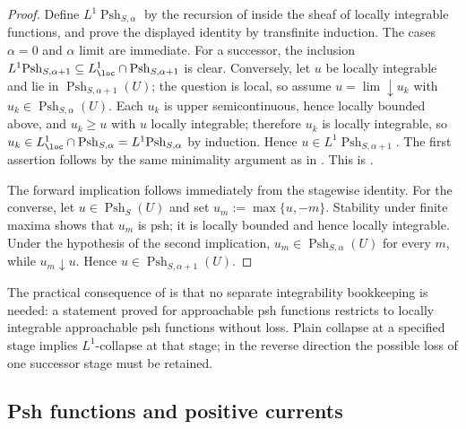 \begin{proof}
Define $L^1\!\operatorname{Psh}_{S,\alpha}$ by the recursion of
 inside the sheaf of locally integrable functions,
and prove the displayed identity by transfinite induction.  The cases
$\alpha=0$ and $\alpha$ limit are immediate.  For a successor, the inclusion
$L^1\!\operatorname{Psh}_{S,\alpha+1}\subseteq
L^1_{\loc}\cap\operatorname{Psh}_{S,\alpha+1}$ is clear.  Conversely, let $u$
be locally integrable and lie in $\operatorname{Psh}_{S,\alpha+1}(U)$; the
question is local, so assume $u=\lim\downarrow u_k$ with
$u_k\in\operatorname{Psh}_{S,\alpha}(U)$.  Each $u_k$ is upper
semicontinuous, hence locally bounded above, and $u_k\ge u$ with $u$ locally
integrable; therefore $u_k$ is locally integrable, so
$u_k\in L^1_{\loc}\cap\operatorname{Psh}_{S,\alpha}
=L^1\!\operatorname{Psh}_{S,\alpha}$ by induction.  Hence
$u\in L^1\!\operatorname{Psh}_{S,\alpha+1}$.  The first assertion follows by
the same minimality argument as in .  This is
\cite[Proposition~8.1.12]{CLD25}.

The forward implication follows immediately from the stagewise
identity.  For the converse, let $u\in\operatorname{Psh}_S(U)$ and set
$u_m:=\max\{u,-m\}$.  Stability under finite maxima shows that $u_m$ is psh;
it is locally bounded and hence locally integrable.  Under the hypothesis of
the second implication, $u_m\in\operatorname{Psh}_{S,\alpha}(U)$ for every
$m$, while $u_m\downarrow u$.  Hence
$u\in\operatorname{Psh}_{S,\alpha+1}(U)$.
\end{proof}

The practical consequence of  is that no
separate integrability bookkeeping is needed: a statement proved for
approachable psh functions restricts to locally integrable approachable psh
functions without loss.  Plain collapse at a specified stage implies
$L^1$-collapse at that stage; in the reverse direction the possible loss of
one successor stage must be retained.

\subsection{Psh functions and positive currents}

